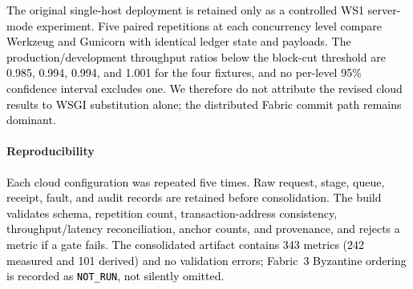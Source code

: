 \documentclass[final,5p,times,twocolumn]{elsarticle}
\begin{document}
\textcolor{black}{The original single-host deployment is retained only as a controlled WS1 server-mode experiment. Five paired repetitions at each concurrency level compare Werkzeug and Gunicorn with identical ledger state and payloads. The production/development throughput ratios below the block-cut threshold are 0.985, 0.994, 0.994, and 1.001 for the four fixtures, and no per-level 95\% confidence interval excludes one. We therefore do not attribute the revised cloud results to WSGI substitution alone; the distributed Fabric commit path remains dominant.}

\paragraph*{\textbf{Reproducibility}} \textcolor{black}{Each cloud configuration was repeated five times. Raw request, stage, queue, receipt, fault, and audit records are retained before consolidation. The build validates schema, repetition count, transaction-address consistency, throughput/latency reconciliation, anchor counts, and provenance, and rejects a metric if a gate fails. The consolidated artifact contains 343 metrics (242 measured and 101 derived) and no validation errors; Fabric~3 Byzantine ordering is recorded as \texttt{NOT\_RUN}, not silently omitted.}
\end{document}
